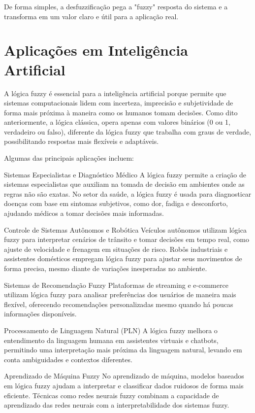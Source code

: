 \documentclass[12pt]{article}
\begin{document}
De forma simples, a desfuzzificação pega a "fuzzy" resposta do sistema e a transforma em um valor claro e útil para a aplicação real.

\section{Aplicações em Inteligência Artificial}

A lógica fuzzy é essencial para a inteligência artificial porque permite que sistemas computacionais lidem com incerteza, imprecisão e subjetividade de forma mais próxima à maneira como os humanos tomam decisões. Como dito anteriormente, a lógica clássica, opera apenas com valores binários (0 ou 1, verdadeiro ou falso), diferente da lógica fuzzy que trabalha com graus de verdade, possibilitando respostas mais flexíveis e adaptáveis. \cite{inbook}

Algumas das principais aplicações incluem:

Sistemas Especialistas e Diagnóstico Médico
    A lógica fuzzy permite a criação de sistemas especialistas que auxiliam na tomada de decisão em ambientes onde as regras não são exatas.
    No setor da saúde, a lógica fuzzy é usada para diagnosticar doenças com base em sintomas subjetivos, como dor, fadiga e desconforto, ajudando médicos a tomar decisões mais informadas.

Controle de Sistemas Autônomos e Robótica
    Veículos autônomos utilizam lógica fuzzy para interpretar cenários de trânsito e tomar decisões em tempo real, como ajuste de velocidade e frenagem em situações de risco.
    Robôs industriais e assistentes domésticos empregam lógica fuzzy para ajustar seus movimentos de forma precisa, mesmo diante de variações inesperadas no ambiente.

Sistemas de Recomendação Fuzzy
    Plataformas de streaming e e-commerce utilizam lógica fuzzy para analisar preferências dos usuários de maneira mais flexível, oferecendo recomendações personalizadas mesmo quando há poucas informações disponíveis.

Processamento de Linguagem Natural (PLN)
    A lógica fuzzy melhora o entendimento da linguagem humana em assistentes virtuais e chatbots, permitindo uma interpretação mais próxima da linguagem natural, levando em conta ambiguidades e contextos diferentes.

Aprendizado de Máquina Fuzzy
    No aprendizado de máquina, modelos baseados em lógica fuzzy ajudam a interpretar e classificar dados ruidosos de forma mais eficiente. Técnicas como redes neurais fuzzy combinam a capacidade de aprendizado das redes neurais com a interpretabilidade dos sistemas fuzzy.
    
\end{document}
